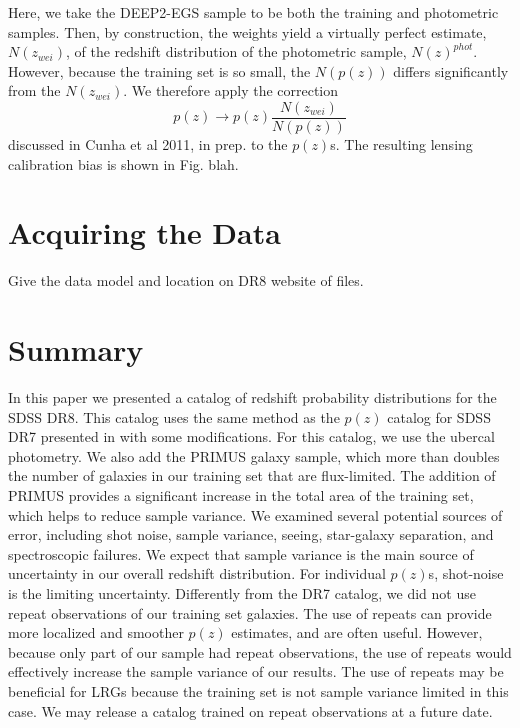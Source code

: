 \documentclass{emulateapj}
\begin{document}
Here, we take the DEEP2-EGS sample to be both the training and photometric samples. 
Then, by construction, the weights yield a virtually perfect estimate, $N(z_{wei})$, of the 
redshift distribution of the photometric sample, $N(z)^{phot}$.
However, because the training set is so small, the $N(p(z))$ differs significantly from the $N(z_{wei})$.
We therefore apply the correction 
\begin{equation}
p(z) \rightarrow p(z)\frac{N(z_{wei})}{N(p(z))}
\end{equation}
discussed in Cunha et al 2011, in prep. to the $p(z)$s.
The resulting lensing calibration bias is shown in Fig. blah.




\section{Acquiring the Data}

{\color{red} Give the data model and location on DR8 website of files. }

\section{Summary}

In this paper we presented a catalog of redshift probability distributions for the SDSS DR8. 
This catalog uses the same method as the $p(z)$ catalog for SDSS DR7 presented in \cite{CunhaPhotoz09} with
some modifications.
For this catalog, we use the ubercal photometry.
We also add the PRIMUS galaxy sample, which more than doubles the number of galaxies in our training set that are flux-limited.
The addition of PRIMUS provides a significant increase in the total area of the training set, which helps to reduce sample variance.
We examined several potential sources of error, including shot noise, sample variance, seeing, star-galaxy separation, and 
spectroscopic failures.
We expect that sample variance is the main source of uncertainty in our overall redshift distribution.
For individual $p(z)$s, shot-noise is the limiting uncertainty.
Differently from the DR7 catalog, we did not use repeat observations of our training set galaxies.
The use of repeats can provide more localized and smoother $p(z)$ estimates, and are often useful.
However, because only part of our sample had repeat observations, the use of repeats would effectively increase the sample
variance of our results. 
The use of repeats may be beneficial for LRGs because the training set is not sample variance limited in this case. 
We may release a catalog trained on repeat observations at a future date.
\end{document}
